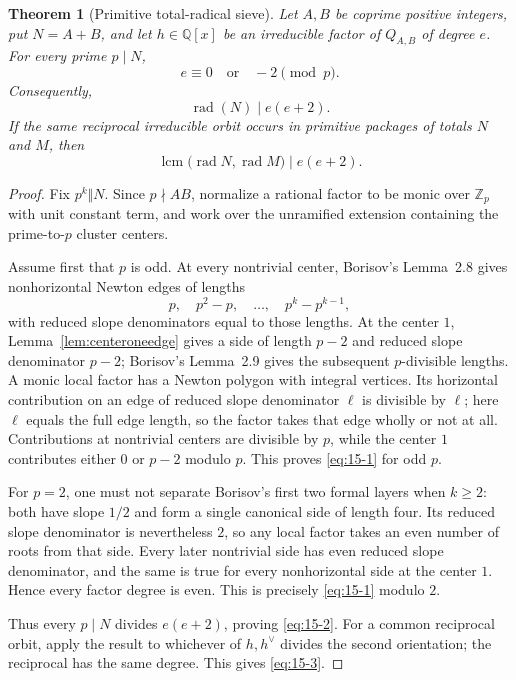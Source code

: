 \documentclass[11pt]{article}
\numberwithin{equation}{section}
\newtheorem{theorem}{Theorem}[section]
\theoremstyle{definition}
\newcommand{\Q}{\mathbb Q}
\newcommand{\Z}{\mathbb Z}
\begin{document}
\begin{theorem}[Primitive total-radical sieve]
\label{thm:radicalsieve}
Let \(A,B\) be coprime positive integers, put \(N=A+B\), and let
\(h\in\Q[x]\) be an irreducible factor of \(Q_{A,B}\) of degree \(e\).
For every prime \(p\mid N\),
\begin{equation}
 e\equiv0\quad\text{or}\quad-2\pmod p.
 \label{eq:15-1}
\end{equation}
Consequently,
\begin{equation}
 \operatorname{rad}(N)\mid e(e+2).
 \label{eq:15-2}
\end{equation}
If the same reciprocal irreducible orbit occurs in primitive packages of
totals \(N\) and \(M\), then
\begin{equation}
 \operatorname{lcm}\bigl(\operatorname{rad}N,
                          \operatorname{rad}M\bigr)
 \mid e(e+2).
 \label{eq:15-3}
\end{equation}
\end{theorem}

\begin{proof}
Fix \(p^k\Vert N\).  Since \(p\nmid AB\), normalize a rational factor to
be monic over \(\Z_p\) with unit constant term, and work over the unramified
extension containing the prime-to-\(p\) cluster centers.

Assume first that \(p\) is odd.  At every nontrivial center, Borisov's
Lemma~2.8 gives nonhorizontal Newton edges of lengths
\[
 p,\quad p^2-p,\quad\ldots,\quad p^k-p^{k-1},
\]
with reduced slope denominators equal to those lengths.  At the center
\(1\), Lemma~\ref{lem:centeroneedge} gives a side of length \(p-2\) and
reduced slope denominator \(p-2\); Borisov's Lemma~2.9 gives the subsequent
\(p\)-divisible lengths.  A monic local
factor has a Newton polygon with integral vertices.  Its horizontal
contribution on an edge of reduced slope denominator \(\ell\) is divisible
by \(\ell\); here \(\ell\) equals the full edge length, so the factor takes
that edge wholly or not at all.  Contributions at nontrivial centers are
divisible by \(p\), while the center \(1\) contributes either \(0\) or
\(p-2\) modulo \(p\).  This proves \eqref{eq:15-1} for odd \(p\).

For \(p=2\), one must not separate Borisov's first two formal layers when
\(k\geq2\): both have slope \(1/2\) and form a single canonical side of
length four.  Its reduced slope denominator is nevertheless \(2\), so any
local factor takes an even number of roots from that side.  Every later
nontrivial side has even reduced slope denominator, and the same is true for
every nonhorizontal side at the center \(1\).  Hence every factor degree is
even.  This is precisely \eqref{eq:15-1} modulo \(2\).

Thus every \(p\mid N\) divides \(e(e+2)\), proving \eqref{eq:15-2}.  For a
common reciprocal orbit, apply the result to whichever of \(h,h^\vee\)
divides the second orientation; the reciprocal has the same degree.  This
gives \eqref{eq:15-3}.
\end{proof}
\end{document}
